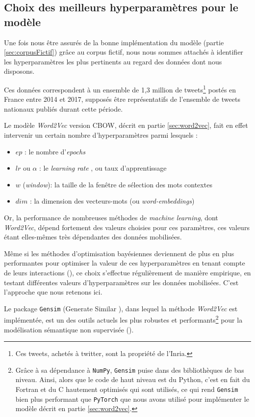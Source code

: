 \documentclass[11pt,french,french]{article}
\let\rmarkdownfootnote\footnote%
\def\footnote{\protect\rmarkdownfootnote}
\begin{document}
\hypertarget{choix-des-meilleurs-hyperparamuxe8tres-pour-le-moduxe8le}{%
\subsection{Choix des meilleurs hyperparamètres pour le modèle}\label{choix-des-meilleurs-hyperparamuxe8tres-pour-le-moduxe8le}}

Une fois nous être assurés de la bonne implémentation du modèle (partie \ref{sec:corpusFictif}) grâce au corpus fictif, nous nous sommes attachés à identifier les hyperparamètres les plus pertinents au regard des données dont nous disposons.

Ces données correspondent à un ensemble de 1,3 million de tweets\footnote{Ces tweets, achetés à twitter, sont la propriété de l'Inria.} postés en France entre 2014 et 2017, supposés être représentatifs de l'ensemble de tweets nationaux publiés durant cette période.

Le modèle \emph{Word2Vec} version CBOW, décrit en partie \ref{sec:word2vec}, fait en effet intervenir un certain nombre d'hyperparamètres parmi lesquels :

\begin{itemize}
\item $ep$ : le nombre d'\og \emph{epochs} \fg{}
\item $lr$ ou $\alpha$ : le \og \emph{learning rate} \fg{}, ou taux d'apprentissage
\item $w$ (\emph{window}): la taille de la fenêtre de sélection des mots contextes
\item $dim$ : la dimension des vecteurs-mots (ou \emph{word-embeddings})
\end{itemize}

Or, la performance de nombreuses méthodes de \emph{machine learning}, dont \emph{Word2Vec}, dépend fortement des valeurs choisies pour ces paramètres, ces valeurs étant elles-mêmes très dépendantes des données mobilisées.

Même si les méthodes d'optimisation bayésiennes deviennent de plus en plus performantes pour optimiser la valeur de ces hyperparamètres en tenant compte de leurs interactions (\cite{Hutter}), ce choix s'effectue régulièrement de manière empirique, en testant différentes valeurs d'hyperparamètres sur les données mobilisées. C'est l'approche que nous retenons ici.

Le package \texttt{Gensim} (\og Generate Similar \fg{}), dans lequel la méthode \emph{Word2Vec} est implémentée, est un des outils actuels les plus robustes et performants\footnote{Grâce à sa dépendance à \texttt{NumPy}, \texttt{Gensim} puise dans des bibliothèques de bas niveau. Ainsi, alors que le code de haut niveau est du Python, c'est en fait du Fortran et du C hautement optimisés qui sont utilisés, ce qui rend \texttt{Gensim} bien plus performant que \texttt{PyTorch} que nous avons utilisé pour implémenter le modèle décrit en partie \ref{sec:word2vec}.} pour la modélisation sémantique non supervisée (\cite{Rehurek}).
\end{document}
